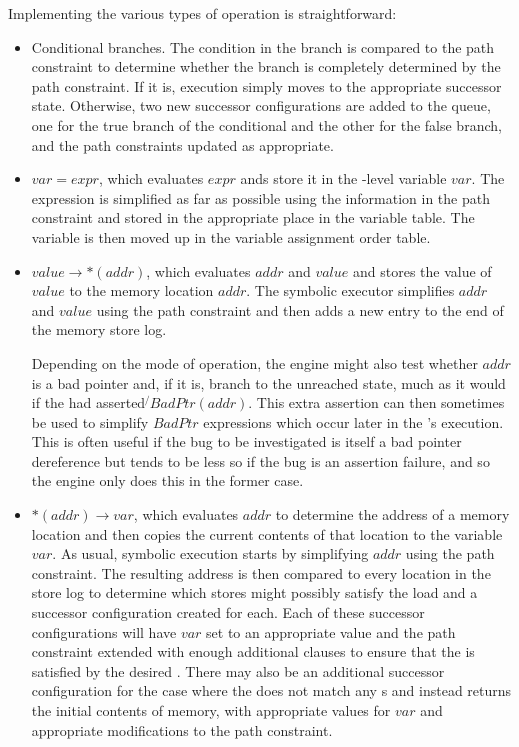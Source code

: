 Implementing the various types of \StateMachine operation is
straightforward:

\begin{itemize}
\item Conditional branches.  The condition in the branch is compared
  to the path constraint to determine whether the branch is completely
  determined by the path constraint.  If it is, execution simply moves
  to the appropriate successor state.  Otherwise, two new successor
  configurations are added to the queue, one for the true branch of
  the conditional and the other for the false branch, and the path
  constraints updated as appropriate.
\item {} $var = expr$, which evaluates $expr$ ands store it
  in the {\StateMachine}-level variable $var$.  The expression is
  simplified as far as possible using the information in the path
  constraint and stored in the appropriate place in the variable
  table.  The variable is then moved up in the variable assignment
  order table.
\item {} $value \rightarrow \ast(addr)$, which evaluates
  $addr$ and $value$ and stores the value of $value$ to the memory
  location $addr$.  The symbolic executor simplifies $addr$ and
  $value$ using the path constraint and then adds a new entry to the
  end of the memory store log.

  Depending on the mode of operation, the engine might also test
  whether $addr$ is a bad pointer and, if it is, branch to the
  unreached state, much as it would if the {\StateMachine} had
  asserted $\not{}BadPtr(addr)$.  This extra assertion can then
  sometimes be used to simplify $BadPtr$ expressions which occur later
  in the {\StateMachine}'s execution.  This is often useful if the bug
  to be investigated is itself a bad pointer dereference but tends to
  be less so if the bug is an assertion failure, and so the engine
  only does this in the former case.

\item {} $\ast(addr) \rightarrow var$, which evaluates
  $addr$ to determine the address of a memory location and then copies
  the current contents of that location to the {\StateMachine}
  variable $var$.  As usual, symbolic execution starts by simplifying
  $addr$ using the path constraint.  The resulting address is then
  compared to every location in the store log to determine which
  stores might possibly satisfy the load and a successor configuration
  created for each.  Each of these successor configurations will have
  $var$ set to an appropriate value and the path constraint extended
  with enough additional clauses to ensure that the  is
  satisfied by the desired .  There may also be an
  additional successor configuration for the case where the
   does not match any s and instead returns
  the initial contents of memory, with appropriate values for $var$
  and appropriate modifications to the path constraint.


\end{itemize}

